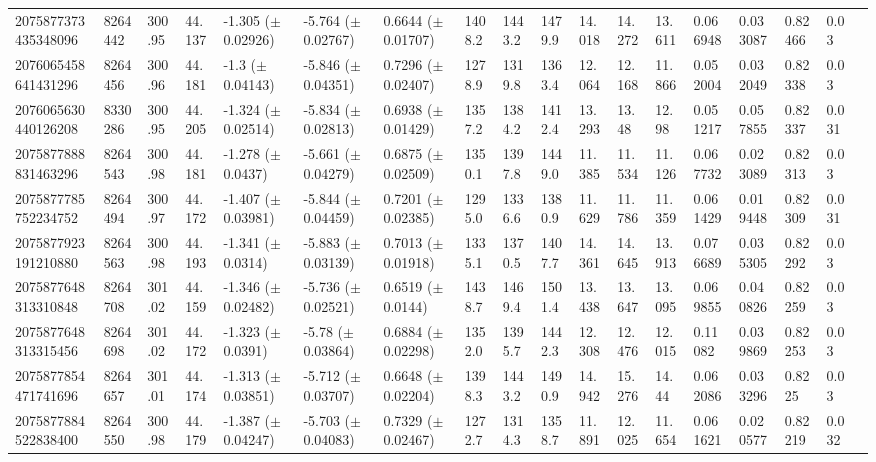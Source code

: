 \begin{sidewaystable}[htbp]
{\begin{tabular}{llllllllllllllllll}
        2075877373435348096 & 8264442 & 300.95 & 44.137 & -1.305 ($\pm$ 0.02926) & -5.764 ($\pm$ 0.02767) & 0.6644 ($\pm$ 0.01707) & 1408.2 & 1443.2 & 1479.9 & 14.018 & 14.272 & 13.611 & 0.066948 & 0.033087 & 0.82466 & 0.03 & \\
        2076065458641431296 & 8264456 & 300.96 & 44.181 & -1.3 ($\pm$ 0.04143) & -5.846 ($\pm$ 0.04351) & 0.7296 ($\pm$ 0.02407) & 1278.9 & 1319.8 & 1363.4 & 12.064 & 12.168 & 11.866 & 0.052004 & 0.032049 & 0.82338 & 0.03 & \\
        2076065630440126208 & 8330286 & 300.95 & 44.205 & -1.324 ($\pm$ 0.02514) & -5.834 ($\pm$ 0.02813) & 0.6938 ($\pm$ 0.01429) & 1357.2 & 1384.2 & 1412.4 & 13.293 & 13.48 & 12.98 & 0.051217 & 0.057855 & 0.82337 & 0.031 & \\
        2075877888831463296 & 8264543 & 300.98 & 44.181 & -1.278 ($\pm$ 0.0437) & -5.661 ($\pm$ 0.04279) & 0.6875 ($\pm$ 0.02509) & 1350.1 & 1397.8 & 1449.0 & 11.385 & 11.534 & 11.126 & 0.067732 & 0.023089 & 0.82313 & 0.03 & \\
        2075877785752234752 & 8264494 & 300.97 & 44.172 & -1.407 ($\pm$ 0.03981) & -5.844 ($\pm$ 0.04459) & 0.7201 ($\pm$ 0.02385) & 1295.0 & 1336.6 & 1380.9 & 11.629 & 11.786 & 11.359 & 0.061429 & 0.019448 & 0.82309 & 0.031 & \\
        2075877923191210880 & 8264563 & 300.98 & 44.193 & -1.341 ($\pm$ 0.0314) & -5.883 ($\pm$ 0.03139) & 0.7013 ($\pm$ 0.01918) & 1335.1 & 1370.5 & 1407.7 & 14.361 & 14.645 & 13.913 & 0.076689 & 0.035305 & 0.82292 & 0.03 & \\
        2075877648313310848 & 8264708 & 301.02 & 44.159 & -1.346 ($\pm$ 0.02482) & -5.736 ($\pm$ 0.02521) & 0.6519 ($\pm$ 0.0144) & 1438.7 & 1469.4 & 1501.4 & 13.438 & 13.647 & 13.095 & 0.069855 & 0.040826 & 0.82259 & 0.03 & \\
        2075877648313315456 & 8264698 & 301.02 & 44.172 & -1.323 ($\pm$ 0.0391) & -5.78 ($\pm$ 0.03864) & 0.6884 ($\pm$ 0.02298) & 1352.0 & 1395.7 & 1442.3 & 12.308 & 12.476 & 12.015 & 0.11082 & 0.039869 & 0.82253 & 0.03 & \\
        2075877854471741696 & 8264657 & 301.01 & 44.174 & -1.313 ($\pm$ 0.03851) & -5.712 ($\pm$ 0.03707) & 0.6648 ($\pm$ 0.02204) & 1398.3 & 1443.2 & 1490.9 & 14.942 & 15.276 & 14.44 & 0.062086 & 0.033296 & 0.8225 & 0.03 & \\
        2075877884522838400 & 8264550 & 300.98 & 44.179 & -1.387 ($\pm$ 0.04247) & -5.703 ($\pm$ 0.04083) & 0.7329 ($\pm$ 0.02467) & 1272.7 & 1314.3 & 1358.7 & 11.891 & 12.025 & 11.654 & 0.061621 & 0.020577 & 0.82219 & 0.032 & \\

\end{tabular}}
\end{sidewaystable}

